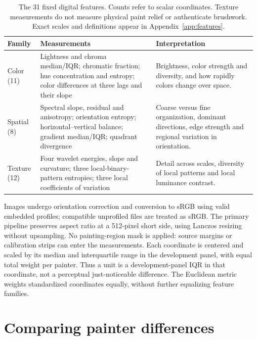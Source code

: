 \documentclass[11pt]{article}
\begin{document}
\begin{table}[!htbp]
\centering\small
\begin{tabularx}{\linewidth}{@{}>{\raggedright\arraybackslash}p{.15\linewidth}>{\raggedright\arraybackslash}p{.35\linewidth}>{\raggedright\arraybackslash}X@{}}
\toprule
Family & Measurements & Interpretation\\
\midrule
Color (11) & Lightness and chroma median/IQR; chromatic fraction; hue
concentration and entropy; color differences at three lags and their slope &
Brightness, color strength and diversity, and how rapidly colors change over space.\\[4pt]
Spatial (8) & Spectral slope, residual and anisotropy; orientation entropy;
horizontal--vertical balance; gradient median/IQR; quadrant divergence &
Coarse versus fine organization, dominant directions, edge strength and regional
variation in orientation.\\[4pt]
Texture (12) & Four wavelet energies, slope and curvature; three local-binary-pattern
entropies; three local coefficients of variation &
Detail across scales, diversity of local patterns and local luminance contrast.\\
\bottomrule
\end{tabularx}
\caption{The 31 fixed digital features. Counts refer to scalar coordinates.
Texture measurements do not measure physical paint relief or authenticate brushwork.
Exact scales and definitions appear in Appendix~\ref{app:features}.}
\label{tab:features}
\end{table}

Images undergo orientation correction and conversion to sRGB using valid
embedded profiles; compatible unprofiled files are treated as sRGB. The primary
pipeline preserves aspect ratio at a 512-pixel short side, using Lanczos resizing
without upsampling. No painting-region mask is applied: source margins or
calibration strips can enter the measurements. Each coordinate is centered and scaled by its
median and interquartile range in the development panel, with equal total
weight per painter. Thus a unit is a development-panel IQR in that coordinate,
not a perceptual just-noticeable difference. The Euclidean metric weights
standardized coordinates equally, without further equalizing feature families.


\FloatBarrier
\section{Comparing painter differences}\label{sec:method}
\end{document}
